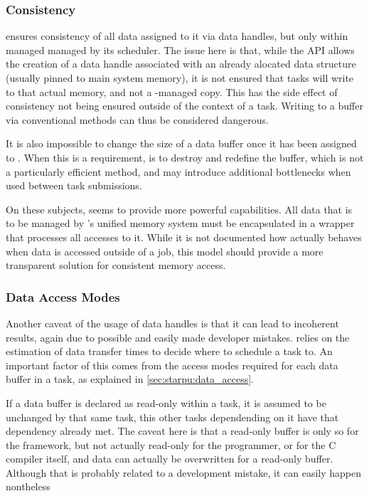 \documentclass[main.tex]{subfiles}
\begin{document}
\subsubsection{Consistency} \label{sec:comparison:consistency}

\starpu ensures consistency of all data assigned to it via data handles, but only within managed managed by its scheduler. The issue here is that, while the API allows the creation of a data handle associated with an already alocated data structure (usually pinned to main system memory), it is not ensured that tasks will write to that actual memory, and not a \starpu-managed copy. This has the side effect of consistency not being ensured outside of the context of a task. Writing to a buffer via conventional methods can thus be considered dangerous.

It is also impossible to change the size of a data buffer once it has been assigned to \starpu. When this is a requirement, is to destroy and redefine the buffer, which is not a particularly efficient method, and may introduce additional bottlenecks when used between task submissions.

On these subjects, \gama seems to provide more powerful capabilities. All data that is to be managed by \gama's unified memory system must be encapsulated in a wrapper that processes all accesses to it. While it is not documented how \gama actually behaves when data is accessed outside of a job, this model should provide a more transparent solution for consistent memory access.


\subsubsection{Data Access Modes}

Another caveat of the usage of data handles is that it can lead to incoherent results, again due to possible and easily made developer mistakes. \starpu relies on the estimation of data transfer times to decide where to schedule a task to. An important factor of this comes from the access modes required for each data buffer in a task, as explained in \cref{sec:starpu:data_access}.

If a data buffer is declared as read-only within a task, it is assumed to be unchanged by that same task, this other tasks dependending on it have that dependency already met.
The caveat here is that a read-only buffer is only so for the framework, but not actually read-only for the programmer, or for the C compiler itself, and data can actually be overwritten for a read-only buffer. Although that is probably related to a development mistake, it can easily happen nontheless
\end{document}
